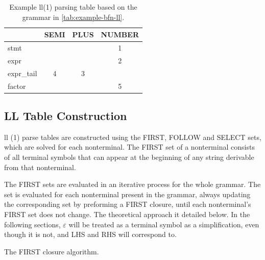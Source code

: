 \begin{table}[H]
  \centering
  \begin{tabular}{|l|c|c|c|}
\hline
              &\textbf{SEMI}  &\textbf{PLUS}  &\textbf{NUMBER}  \\
\hline
  stmt        &               &               &1                \\
\hline
  expr        &               &               &2                \\
\hline
  expr\_tail  &4              &3              &                 \\
\hline
  factor      &               &               &5                \\
\hline
  \end{tabular}
  \caption{Example \gls{ll}(1) parsing table based on the grammar in \ref{tab:example-bfn-ll}.}
  \label{tab:example-ll-table}
\end{table}

\subsection{LL Table Construction}
\gls{ll} (1) parse tables are constructed using the FIRST, FOLLOW and SELECT sets, which are solved for each nonterminal. The FIRST set of a nonterminal consists of all terminal symbols that can appear at the beginning of any string derivable from that nonterminal.

The FIRST sets are evaluated in an iterative process for the whole grammar. The set is evaluated for each nonterminal present in the grammar, always updating the corresponding set by preforming a FIRST closure, until each nonterminal's FIRST set does not change. The theoretical approach it detailed below. In the following sections, $\varepsilon$ will be treated as a terminal symbol as a simplification, even though it is not, and LHS and RHS will correspond to. 


\begingroup
\vspace{1.5em}
\begin{algorithm}[H]
  \setlength{\algomargin}{1.5em}


\caption{The FIRST closure algorithm.}
\label{alg:first-closure}
\end{algorithm}
\vspace{1.5em}
\endgroup

